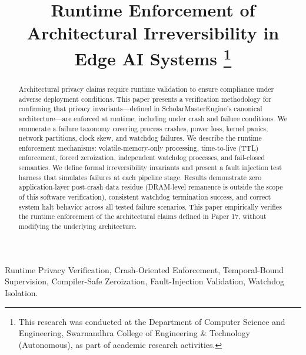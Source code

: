 \documentclass[conference]{IEEEtran}
\begin{document}
\title{Runtime Enforcement of Architectural Irreversibility in Edge AI Systems
\thanks{This research was conducted at the Department of Computer Science and Engineering, Swarnandhra College of Engineering \& Technology (Autonomous), as part of academic research activities.}
}

\author{
}

\maketitle

\begin{abstract}
Architectural privacy claims require runtime validation to ensure compliance under adverse deployment conditions. This paper presents a verification methodology for confirming that privacy invariants---defined in ScholarMasterEngine's canonical architecture---are enforced at runtime, including under crash and failure conditions. We enumerate a failure taxonomy covering process crashes, power loss, kernel panics, network partitions, clock skew, and watchdog failures. We describe the runtime enforcement mechanisms: volatile-memory-only processing, time-to-live (TTL) enforcement, forced zeroization, independent watchdog processes, and fail-closed semantics. We define formal irreversibility invariants and present a fault injection test harness that simulates failures at each pipeline stage. Results demonstrate zero application-layer post-crash data residue (DRAM-level remanence is outside the scope of this software verification), consistent watchdog termination success, and correct system halt behavior across all tested failure scenarios. This paper empirically verifies the runtime enforcement of the architectural claims defined in Paper 17, without modifying the underlying architecture.
\end{abstract}

\begin{IEEEkeywords}
Runtime Privacy Verification, Crash-Oriented Enforcement, Temporal-Bound Supervision, Compiler-Safe Zeroization, Fault-Injection Validation, Watchdog Isolation.
\end{IEEEkeywords}
\end{document}
